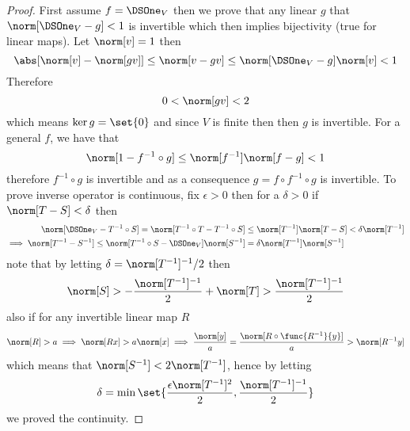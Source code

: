\begin{proof}
    First assume \(f = \DSOne_V\) then we prove that any linear \(g\) that \(\norm[\DSOne_V - g] < 1\) is invertible which then implies bijectivity (true for linear maps). Let \(\norm[v] = 1\) then
    \begin{equation*}
        \abs[\norm[v] - \norm[gv]] \leq \norm[v - gv] \leq \norm[\DSOne_V - g] \norm[v] < 1
    \end{equation*}
    Therefore
    \begin{equation*}
        0 < \norm[gv] < 2
    \end{equation*}
    which means \(\ker g = \set{0}\) and since \(V\) is finite then then \(g\) is invertible. For a general \(f\), we have that
    \begin{equation*}
        \norm[1 - f^{-1} \circ g] \leq \norm[f^{-1}]\norm[f -g] < 1
    \end{equation*}
    therefore \(f^{-1} \circ g\) is invertible and as a consequence \(g = f \circ f^{-1} \circ g\) is invertible. To prove inverse operator is continuous, fix \(\epsilon > 0\) then for a \(\delta > 0\) if \(\norm[T-S] < \delta\) then
    \begin{align*}
        \norm[\DSOne_V- T^{-1} \circ S]= \norm[T^{-1} \circ T  - T^{-1} \circ S]           & \leq \norm[T^{-1}] \norm[T-S] < \delta \norm[T^{-1}] \\
        \implies  \norm[T^{-1} - S^{-1}] \leq \norm[T^{-1}\circ S - \DSOne_V]\norm[S^{-1}] & = \delta \norm[T^{-1}] \norm[S^{-1}]
    \end{align*}
    note that by letting \(\delta = \norm[T^{-1}]^{-1}/2\) then
    \begin{equation*}
        \norm[S] > -\dfrac{\norm[T^{-1}]^{-1}}{2} + \norm[T] > \dfrac{\norm[T^{-1}]^{-1}}{2}
    \end{equation*}
    also if for any invertible linear map \(R\)
    \begin{equation*}
        \norm[R] > a \implies \norm[Rx] > a\norm[x] \implies \dfrac{\norm[y]}{a} = \dfrac{\norm[R\circ \func{R^{-1}}{y}]}{a} > \norm[R^{-1}y]
    \end{equation*}
    which means that \(\norm[S^{-1}] < 2 \norm[T^{-1}]\), hence by letting
    \begin{equation*}
        \delta = \min \set{\dfrac{\epsilon \norm[T^{-1}]^2}{2} , \dfrac{\norm[T^{-1}]^{-1}}{2}}
    \end{equation*}
    we proved the continuity.
\end{proof}

